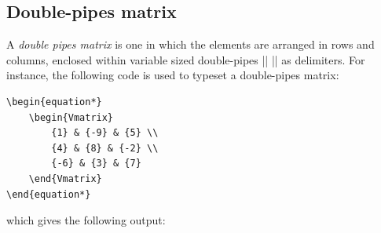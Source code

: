 	\subsection{Double-pipes matrix}
		A \emph{double pipes matrix} is one in which the elements are arranged in rows and columns, enclosed within variable sized double-pipes || || as delimiters. For instance, the following code is used to typeset a double-pipes matrix:
\begin{lstlisting}
\begin{equation*}
	\begin{Vmatrix}
		{1} & {-9} & {5} \\
		{4} & {8} & {-2} \\
		{-6} & {3} & {7}
	\end{Vmatrix}
\end{equation*}
\end{lstlisting}
		which gives the following output:
